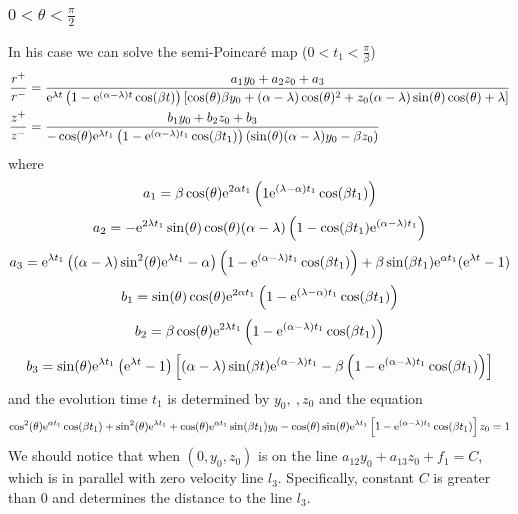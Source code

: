 \documentclass[a4paper,10pt]{article}
\begin{document}
	
	\subsubsection{$0<\theta < \frac{\pi}{2}$} 
	 In his case we can solve the semi-Poincar{\'e} map ($0<t_1<\frac{\pi}{\beta}$) 
	\begin{align}
	\frac{r^+}{r^-} & =\frac{a_1 {y_0}+a_2{z_0}+a_3}
	{{\rm e}^{\lambda t} \left(1-{\rm e}^{(\alpha -\lambda) t} \cos(\beta t)\right) 
		\left[\cos(\theta) \beta {y_0}+(\alpha-\lambda) \cos(\theta)^{2}+{z_0} (\alpha-\lambda) \sin(\theta) \cos(\theta)+\lambda
		\right]
	} \\
	\frac{z^+}{z^-} &= \frac{b_1 y_0 + b_2 z_0 +b_3}
	{-\cos(\theta) {\rm e}^{\lambda t_1} 
		\left(
		1- {\rm e}^{(\alpha - \lambda) t_1} \cos(\beta t_1)
		\right) 
		\left( 
		\sin(\theta) (\alpha-\lambda){y_0}-\beta {z_0} \right)
	}
	\end{align}
	where 
	$$
	a_1=\beta \cos(\theta) {\rm e}^{2 \alpha t_1} \left(1 {\rm e}^{(\lambda-\alpha) t_1} \cos(\beta t_1)\right)
	$$
	$$
	a_2 =-{\rm e}^{2\lambda t_1} \sin(\theta) \cos(\theta) (\alpha-\lambda) \left(1-\cos(\beta t_1) {\rm e}^{(\alpha-\lambda) t_1} \right)
	$$
	$$
	a_3 = {\rm e}^{\lambda t_1} 
	\left(
	(\alpha - \lambda)\sin^2(\theta) {\rm e}^{\lambda t_1} - \alpha 
	\right) 
	\left(
	1 - {\rm e}^{(\alpha - \lambda) t_1} \cos(\beta t_1)
	\right) + \beta \sin(\beta t_1) {\rm e}^{\alpha t_1} ({\rm e}^{\lambda t}- 1)
	$$
	$$
	b_1= \sin(\theta) \cos(\theta) {\rm e}^{2 \alpha t_1} 
	\left(
	1 -{\rm e}^{(\lambda-\alpha) t_1} \cos(\beta t_1)
	\right)
	$$
	$$
	b_2= \beta \cos(\theta) {\rm e}^{2 \lambda t_1}
	\left(
	1 -{\rm e}^{(\alpha-\lambda) t_1} \cos(\beta t_1)
	\right)
	$$
	$$
	b_3= \sin(\theta) {\rm e}^{\lambda t_1} 
	\left({\rm e}^{\lambda t}-1\right) 
	\left[
	(\alpha-\lambda) \sin(\beta t) {\rm e}^{(\alpha-\lambda) t_1}-\beta \left(1-{\rm e}^{(\alpha-\lambda) t_1} \cos(\beta t_1)\right) 
	\right]
	$$
	and the evolution time $t_1$ is determined by $y_0,~,z_0$ and the equation
	\begin{equation}
	\cos^2(\theta) {\rm e}^{\alpha t_1} \cos(\beta t_1)+\sin^2 (\theta) {\rm e}^{\lambda t_1}+\cos(\theta) {\rm e}^{\alpha t_1} \sin(\beta t_1) y_0-\cos(\theta) \sin(\theta) {\rm e}^{\lambda t_1}\left[1 - {\rm e}^{(\alpha-\lambda) t_1} \cos(\beta t_1)\right] z_0 =1
	\label{eq:evolution time governing equation}
	\end{equation}
	We should notice that when $(0,y_0,z_0)$ is on the line $a_{12} y_0 + a_{13} z_0 + f_1 = C$, which is in parallel with zero velocity line $l_3$. Specifically, constant $C$ is greater than 0 and determines the distance to the line $l_3$. 
	
\end{document}
